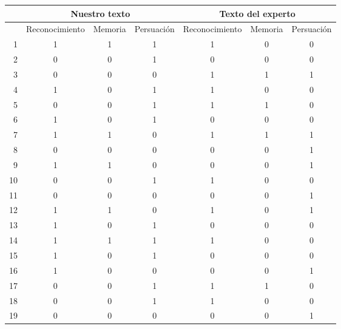 \begin{table}
\centering
\tiny
\begin{tabular}{|r|c|c|c|c|c|c|}
   & \multicolumn{3}{c|}{Nuestro texto}     & \multicolumn{3}{c|}{Texto del experto}   \\\hline
   & Reconocimiento & Memoria & Persuación & Reconocimiento & Memoria & Persuación \\\hline \hline

1 &         1 &         1 &         1 &         1 &         0 &         0 \\
2 &         0 &         0 &         1 &         0 &         0 &         0 \\
3 &         0 &         0 &         0 &         1 &         1 &         1 \\
4 &         1 &         0 &         1 &         1 &         0 &         0 \\
5 &         0 &         0 &         1 &         1 &         1 &         0 \\
6 &         1 &         0 &         1 &         0 &         0 &         0 \\
7 &         1 &         1 &         0 &         1 &         1 &         1 \\
8 &         0 &         0 &         0 &         0 &         0 &         1 \\
9 &         1 &         1 &         0 &         0 &         0 &         1 \\
10 &         0 &         0 &         1 &         1 &         0 &         0 \\
11 &         0 &         0 &         0 &         0 &         0 &         1 \\
12 &         1 &         1 &         0 &         1 &         0 &         1 \\
13 &         1 &         0 &         1 &         0 &         0 &         0 \\
14 &         1 &         1 &         1 &         1 &         0 &         0 \\
15 &         1 &         0 &         1 &         0 &         0 &         0 \\
16 &         1 &         0 &         0 &         0 &         0 &         1 \\
17 &         0 &         0 &         1 &         1 &         1 &         0 \\
18 &         0 &         0 &         1 &         1 &         0 &         0 \\
19 &         0 &         0 &         0 &         0 &         0 &         1 \\

\end{tabular}
\end{table}
